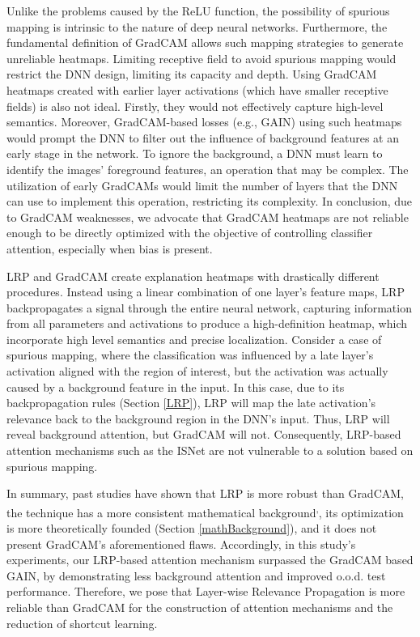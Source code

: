 \documentclass[fleqn,10pt]{wlscirep}
\begin{document}
{Unlike the problems caused by the ReLU function, the possibility of spurious mapping is intrinsic to the nature of deep neural networks. Furthermore, the fundamental definition of GradCAM allows such mapping strategies to generate unreliable heatmaps. Limiting receptive field to avoid spurious mapping would restrict the DNN design, limiting its capacity and depth. Using GradCAM heatmaps created with earlier layer activations (which have smaller receptive fields) is also not ideal. Firstly, they would not effectively capture high-level semantics\cite{GCAMAbstraction}. Moreover, GradCAM-based losses (e.g., GAIN) using such heatmaps would prompt the DNN to filter out the influence of background features at an early stage in the network. To ignore the background, a DNN must learn to identify the images' foreground features, an operation that may be complex. The utilization of early GradCAMs would limit the number of layers that the DNN can use to implement this operation, restricting its complexity. In conclusion, due to GradCAM weaknesses, we advocate that GradCAM heatmaps are not reliable enough to be directly optimized with the objective of controlling classifier attention, especially when bias is present.

LRP and GradCAM create explanation heatmaps with drastically different procedures. Instead using a linear combination of one layer's feature maps, LRP backpropagates a signal through the entire neural network, capturing information from all parameters and activations to produce a high-definition heatmap, which incorporate high level semantics and precise localization\cite{LRPBook}. Consider a case of spurious mapping, where the classification was influenced by a late layer's activation aligned with the region of interest, but the activation was actually caused by a background feature in the input. In this case, due to its backpropagation rules (Section \ref{LRP}), LRP will map the late activation's relevance back to the background region in the DNN's input. Thus, LRP will reveal background attention, but GradCAM will not. Consequently, LRP-based attention mechanisms such as the ISNet are not vulnerable to a solution based on spurious mapping.

In summary, past studies have shown that LRP is more robust than GradCAM\cite{LRPRobustness}, the technique has a more consistent mathematical background\cite{LRP}\textsuperscript{,}\cite{LRPBook}, its optimization is more theoretically founded (Section \ref{mathBackground}), and it does not present GradCAM's aforementioned flaws. Accordingly, in this study's experiments, our LRP-based attention mechanism surpassed the GradCAM based GAIN, by demonstrating less background attention and improved o.o.d. test performance. Therefore, we pose that Layer-wise Relevance Propagation is more reliable than GradCAM for the construction of attention mechanisms and the reduction of shortcut learning.


}
\end{document}
